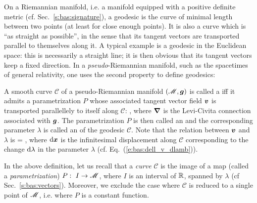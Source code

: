 On a Riemannian manifold, i.e. a manifold equipped with a positive definite metric
(cf. Sec.~\ref{s:bas:signature}), a geodesic is the curve of minimal length between
two points (at least for close enough points). It is also a curve which is
``as straight as possible'', in the sense that its tangent vectors are transported parallel
to themselves along it. A typical example is a geodesic in the Euclidean space: this is
necessarily a straight line; it is then obvious that its tangent vectors
keep a fixed direction. In a \emph{pseudo}-Riemannian manifold, such as the
spacetimes of general relativity, one uses
the second property to define geodesics:
\begin{greybox}
A smooth curve $\mathcal{C}$ of a pseudo-Riemannian manifold $(\mathscr{M},\bm{g})$ is
called a  iff it admits a parametrization $P$ whose associated
tangent vector field $\bm{v}$ is transported parallellely to itself along
$\mathcal{C}$:
\be \label{e:geo:geod_eq_v}
    ,
\ee
where $\bm{\nabla}$ is the Levi-Civita connection associated with $\bm{g}$.
The parametrization $P$ is then called an
and the corresponding parameter $\lambda$ is called an
 of the
geodesic $\mathcal{C}$. Note that the relation between $\bm{v}$ and $\lambda$ is
\be \label{e:geo:v_dxdlambda}
     =  ,
\ee
where $\mathrm{d}\bm{x}$ is the infinitesimal displacement along $\mathcal{C}$ corresponding
to the change $\mathrm{d}\lambda$ in the parameter $\lambda$
(cf. Eq.~(\ref{e:bas:dell_v_dlamb})).
\end{greybox}
In the above definition, let us recall that a \emph{curve} $\mathcal{C}$ is the image of a map (called
a \emph{parametrization}) $P:\ I\rightarrow \mathscr{M}$,
where $I$ is an interval of $\mathbb{R}$, spanned by $\lambda$ (cf Sec.~\ref{s:bas:vectors}).
Moreover, we exclude the case where $\mathcal{C}$ is reduced to a single point
of $\mathscr{M}$, i.e. where $P$ is a constant function.


